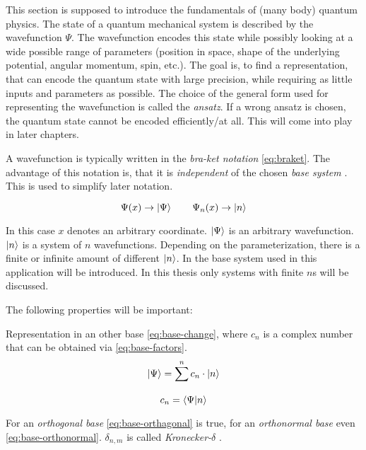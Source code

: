 This section is supposed to introduce the fundamentals of (many body) quantum physics.
The state of a quantum mechanical system is described by the wavefunction $\Psi$. 
The wavefunction encodes this state while possibly looking at a wide possible range of parameters (position in space, shape of the underlying potential, angular momentum, spin, etc.).
The goal is, to find a representation, that can encode the quantum state with large precision, while requiring as little inputs and parameters as possible. The choice of the general form used for representing the wavefunction is called the \emph{ansatz}. 
If a wrong ansatz is chosen, the quantum state cannot be encoded efficiently/at all. This will come into play in later chapters.

A wavefunction is typically written in the \emph{bra-ket notation} \ref{eq:braket}. The advantage of this notation is, that it is \emph{independent} of the chosen \emph{base system} \cite[]{schwablQM}. This is used to simplify later notation.  

\begin{equation}
    \label{eq:braket}
    \Psi(x) \rightarrow \ket{\Psi} \qquad \Psi_n(x) \rightarrow \ket{n}
\end{equation}

In this case $x$ denotes an arbitrary coordinate. $\ket{\Psi}$ is an arbitrary wavefunction. $\ket{n}$ is a system of $n$ wavefunctions. Depending on the parameterization, there is a finite or infinite amount of different $\ket{n}$. In  the base system used in this application will be introduced. In this thesis only systems with finite $n$s will be discussed.

The following properties will be important:

Representation in an other base \ref{eq:base-change}, where $c_n$ is a complex number that can be obtained via \ref{eq:base-factors}.
\begin{equation}
    \label{eq:base-change}
    \ket{\Psi} = \sum\limits_{}^{n} c_n \cdot \ket{n}
\end{equation}
\begin{equation}
    \label{eq:base-factors}
    c_n = \bra{\Psi}\ket{n}
\end{equation}

For an \emph{orthogonal base} \ref{eq:base-orthagonal} is true, for an \emph{orthonormal base} even \ref{eq:base-orthonormal}. $\delta_{n, m}$ is called \emph{Kronecker-$\delta$} \cite{schwablQM}.

